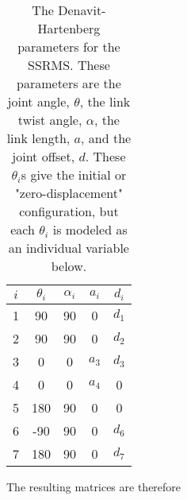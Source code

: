 \documentclass[onecolumn,10pt]{jhwhw}
\begin{document}
\begin{table}[h]
\centering
\begin{tabular}{c|*{4}{c}}
\toprule
$i$ & $\theta_i$ & $\alpha_i$ & $a_i$ & $d_i$ \\
\midrule
1 &  90 & 90 &     0 & $d_1$ \\
2 &  90 & 90 &     0 & $d_2$ \\
3 &   0 &  0 & $a_3$ & $d_3$ \\
4 &   0 &  0 & $a_4$ &     0 \\
5 & 180 & 90 &     0 &     0 \\
6 & -90 & 90 &     0 & $d_6$ \\
7 & 180 & 90 &     0 & $d_7$ \\
\bottomrule
\end{tabular}
\caption{The Denavit-Hartenberg parameters for the SSRMS. These parameters are the joint angle, $\theta$, the link twist angle, $\alpha$, the link length, $a$, and the joint offset, $d$. These $\theta_i$s give the initial or "zero-displacement" configuration, but each $\theta_i$ is modeled as an individual variable below.}
\end{table}
The resulting matrices are therefore
\end{document}
